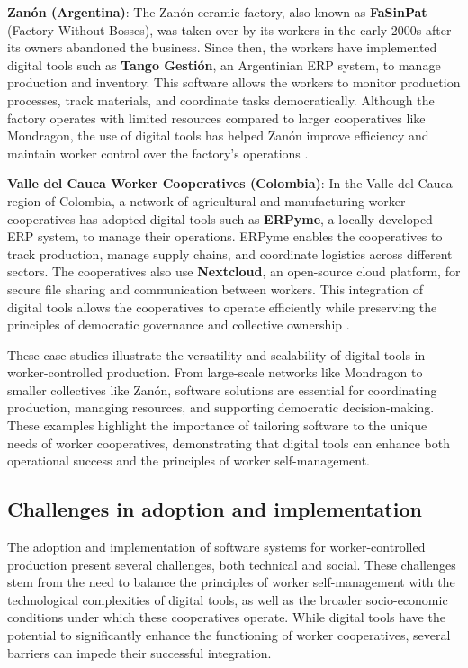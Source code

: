 \begin{refsection}
\textbf{Zanón (Argentina)}: The Zanón ceramic factory, also known as \textbf{FaSinPat} (Factory Without Bosses), was taken over by its workers in the early 2000s after its owners abandoned the business. Since then, the workers have implemented digital tools such as \textbf{Tango Gestión}, an Argentinian ERP system, to manage production and inventory. This software allows the workers to monitor production processes, track materials, and coordinate tasks democratically. Although the factory operates with limited resources compared to larger cooperatives like Mondragon, the use of digital tools has helped Zanón improve efficiency and maintain worker control over the factory’s operations \cite[pp.~78-82]{sitrin2012}.

\textbf{Valle del Cauca Worker Cooperatives (Colombia)}: In the Valle del Cauca region of Colombia, a network of agricultural and manufacturing worker cooperatives has adopted digital tools such as \textbf{ERPyme}, a locally developed ERP system, to manage their operations. ERPyme enables the cooperatives to track production, manage supply chains, and coordinate logistics across different sectors. The cooperatives also use \textbf{Nextcloud}, an open-source cloud platform, for secure file sharing and communication between workers. This integration of digital tools allows the cooperatives to operate efficiently while preserving the principles of democratic governance and collective ownership \cite[pp.~113-116]{gago2017}.

These case studies illustrate the versatility and scalability of digital tools in worker-controlled production. From large-scale networks like Mondragon to smaller collectives like Zanón, software solutions are essential for coordinating production, managing resources, and supporting democratic decision-making. These examples highlight the importance of tailoring software to the unique needs of worker cooperatives, demonstrating that digital tools can enhance both operational success and the principles of worker self-management.

\subsection{Challenges in adoption and implementation}

The adoption and implementation of software systems for worker-controlled production present several challenges, both technical and social. These challenges stem from the need to balance the principles of worker self-management with the technological complexities of digital tools, as well as the broader socio-economic conditions under which these cooperatives operate. While digital tools have the potential to significantly enhance the functioning of worker cooperatives, several barriers can impede their successful integration.


\end{refsection}
